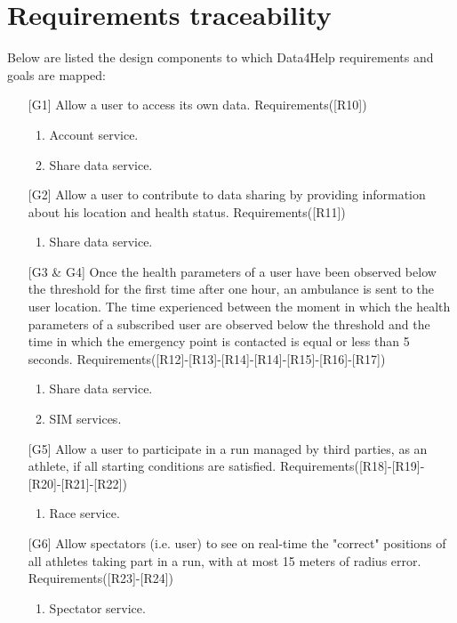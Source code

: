\section{Requirements traceability}
Below are listed the design components to which Data4Help requirements and goals are mapped: 
\begin{itemize}
\item[{[G1]}] Allow a user to access its own data. Requirements([R10])
	\begin{enumerate}
	\item Account service.
	\item Share data service.
	\end{enumerate}
\item[{[G2]}] Allow a user to contribute to data sharing by providing information about his location and health status. Requirements([R11])
	\begin{enumerate}
	\item Share data service.
	\end{enumerate}
\item[{[G3 \& G4]}] Once the health parameters of a user have been observed below the threshold for the first time after one hour, an ambulance is sent to the user location. 
The time experienced between the moment in which the health parameters of a subscribed user are observed below the threshold and the time in which the emergency point is contacted is equal or less than 5 seconds. Requirements([R12]-[R13]-[R14]-[R14]-[R15]-[R16]-[R17])
	\begin{enumerate}
	\item Share data service.
	\item SIM services.
	\end{enumerate}
\item[{[G5]}] Allow a user to participate in a run managed by third parties, as an athlete, if all starting conditions are satisfied. Requirements([R18]-[R19]-[R20]-[R21]-[R22])
	\begin{enumerate}
	\item Race service.
	\end{enumerate}
\item[{[G6]}] Allow spectators (i.e. user) to see on real-time the "correct" positions of all athletes taking part in a run, with at most 15 meters of radius error.
Requirements([R23]-[R24])
	\begin{enumerate}
	\item  Spectator service.
	\end{enumerate}

\end{itemize}
